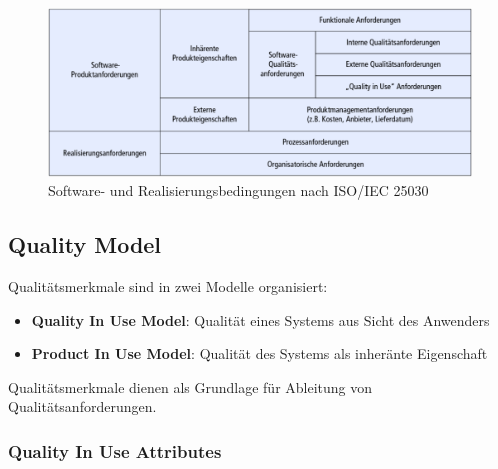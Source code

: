 \documentclass[a4paper]{article}
\begin{document}
		\begin{figure}[!htb]
			\centering
			\includegraphics[width=.9\textwidth]{img/re/06/iso25030.png}
			\caption{Software- und Realisierungsbedingungen nach ISO/IEC 25030}
			\label{fig:re_iso25030}
		\end{figure}

		\subsection{Quality Model}
		
		Qualitätsmerkmale sind in zwei Modelle organisiert:
		\begin{itemize}
			\item \textbf{Quality In Use Model}: Qualität eines Systems aus Sicht des Anwenders
			\item \textbf{Product In Use Model}: Qualität des Systems als inheränte Eigenschaft
		\end{itemize}
		Qualitätsmerkmale dienen als Grundlage für Ableitung von Qualitätsanforderungen.
	
\newpage
		
			\subsubsection{Quality In Use Attributes}
			
\end{document}
